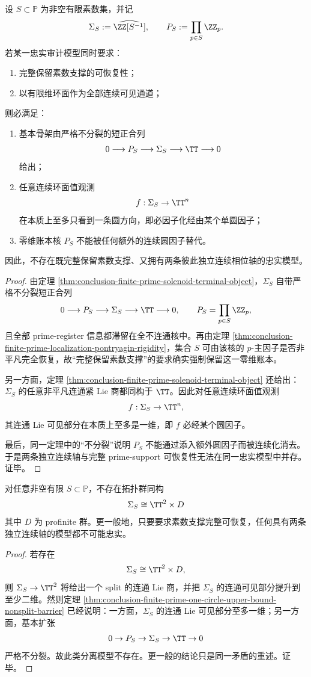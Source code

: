 \begin{theorem}[有限素数账本的一圆可见上界与不分裂壁垒]\label{thm:conclusion-finite-prime-one-circle-upper-bound-nonsplit-barrier}
设 \(S\subset \mathbb P\) 为非空有限素数集，并记
\[
\Sigma_S:=\widehat{\ZZ[S^{-1}]},
\qquad
P_S:=\prod_{p\in S}\ZZ_p.
\]
若某一忠实审计模型同时要求：
\begin{enumerate}
  \item 完整保留素数支撑的可恢复性；
  \item 以有限维环面作为全部连续可见通道；
\end{enumerate}
则必满足：
\begin{enumerate}
  \item 基本骨架由严格不分裂的短正合列
  \[
  0\longrightarrow P_S\longrightarrow \Sigma_S\longrightarrow \TT\longrightarrow 0
  \]
  给出；
  \item 任意连续环面值观测
  \[
  f:\Sigma_S\to \TT^n
  \]
  在本质上至多只看到一条圆方向，即必因子化经由某个单圆因子；
  \item 零维账本核 \(P_S\) 不能被任何额外的连续圆因子替代。
\end{enumerate}
因此，不存在既完整保留素数支撑、又拥有两条彼此独立连续相位轴的忠实模型。
\end{theorem}
\begin{proof}
由定理 \ref{thm:conclusion-finite-prime-solenoid-terminal-object}，\(\Sigma_S\) 自带严格不分裂短正合列
\[
0\longrightarrow P_S\longrightarrow \Sigma_S\longrightarrow \TT\longrightarrow 0,
\qquad
P_S=\prod_{p\in S}\ZZ_p,
\]
且全部 prime-register 信息都滞留在全不连通核中。再由定理 \ref{thm:conclusion-finite-prime-localization-pontryagin-rigidity}，集合 \(S\) 可由该核的 \(p\)-主因子是否非平凡完全恢复，故“完整保留素数支撑”的要求确实强制保留这一零维账本。

另一方面，定理 \ref{thm:conclusion-finite-prime-solenoid-terminal-object} 还给出：\(\Sigma_S\) 的任意非平凡连通紧 Lie 商都同构于 \(\TT\)。因此对任意连续环面值观测
\[
f:\Sigma_S\to \TT^n,
\]
其连通 Lie 可见部分在本质上至多是一维，即 \(f\) 必经某个圆因子。

最后，同一定理中的“不分裂”说明 \(P_S\) 不能通过添入额外圆因子而被连续化消去。于是两条独立连续轴与完整 prime-support 可恢复性无法在同一忠实模型中并存。证毕。
\end{proof}

\begin{corollary}[双连续轴与零维账本的忠实分离模型不存在]\label{cor:conclusion-finite-prime-no-faithful-two-circle-splitting}
对任意非空有限 \(S\subset\mathbb P\)，不存在拓扑群同构
\[
\Sigma_S\cong \TT^2\times D
\]
其中 \(D\) 为 profinite 群。更一般地，只要要求素数支撑完整可恢复，任何具有两条独立连续轴的模型都不可能忠实。
\end{corollary}
\begin{proof}
若存在
\[
\Sigma_S\cong \TT^2\times D,
\]
则 \(\Sigma_S\to \TT^2\) 将给出一个 split 的连通 Lie 商，并把 \(\Sigma_S\) 的连通可见部分提升到至少二维。然则定理 \ref{thm:conclusion-finite-prime-one-circle-upper-bound-nonsplit-barrier} 已经说明：一方面，\(\Sigma_S\) 的连通 Lie 可见部分至多一维；另一方面，基本扩张
\[
0\to P_S\to \Sigma_S\to \TT\to 0
\]
严格不分裂。故此类分离模型不存在。更一般的结论只是同一矛盾的重述。证毕。
\end{proof}


